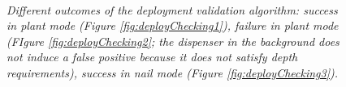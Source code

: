 \begin{figure}
	\centering
	\\
		
	\caption{\textit{Different outcomes of the deployment validation algorithm: success in plant mode (Figure \ref{fig:deployChecking1}), failure in plant mode (FIgure \ref{fig:deployChecking2}; the dispenser in the background does not induce a false positive because it does not satisfy depth requirements), success in nail mode (Figure \ref{fig:deployChecking3}).}}
	\label{fig:deployChecking}
\end{figure}


